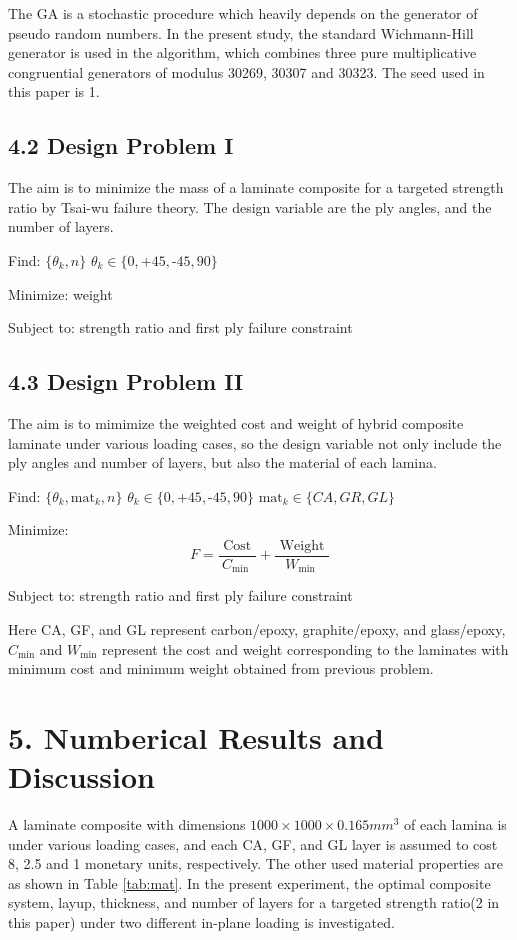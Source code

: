 \documentclass[Afour,sagev,times]{sagej}
\begin{document}
The GA is a stochastic procedure which heavily depends on the generator of pseudo random numbers. In
the present study, the standard Wichmann-Hill generator is used in the algorithm, which combines
three pure multiplicative congruential generators of modulus 30269, 30307 and 30323.  The seed used
in this paper is 1.


\subsection{4.2 Design Problem I}

The aim is to minimize the mass of a laminate composite for a targeted strength
ratio by Tsai-wu failure theory. The design variable are the ply angles, and the
number of layers.

Find: $\{\theta_k, n\}$ $\theta_k \in \{ 0,\text{+}45,\text{-}45,90\}$ 

Minimize: weight

Subject to: strength ratio and first ply failure constraint


\subsection{4.3 Design Problem II}
The aim is to mimimize the weighted cost and weight of hybrid composite
laminate under various loading cases, so the design variable not only include
the ply angles and number of layers, but also the material of each lamina. 


Find: $\{\theta_k,\text{mat}_k, n\}$ $\theta_k \in \{ 0,\text{+}45,\text{-}45,90\}$ $\text{mat}_k \in \{CA, GR, GL \}$

Minimize: 
\begin{equation}
	F=\frac{\text { Cost }}{C_{\text {min }}}+\frac{\text { Weight }}{W_{\text {min }}}
\end{equation}

Subject to: strength ratio and first ply failure constraint


Here CA, GF, and GL represent carbon/epoxy, graphite/epoxy, and glass/epoxy,
 $C_{\text{min}}$ and $W_{\text{min}}$ represent the cost and
weight corresponding to the laminates with minimum cost and minimum weight
obtained from previous problem.

\section{5. Numberical Results and Discussion}
A laminate composite with dimensions $1000 \times 1000 \times 0.165 mm^3$ of
each lamina is under various loading cases, and each CA, GF, and GL layer is
assumed to cost 8, 2.5 and 1 monetary units, respectively.  The other used
material properties are as shown in Table \ref{tab:mat}.  In the present
experiment,  the optimal composite system, layup, thickness, and number of
layers for a targeted strength ratio(2 in this paper) under two different
in-plane loading is investigated.
\end{document}
